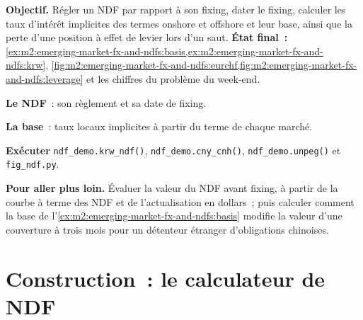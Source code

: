\begin{tutorial}
\textbf{Objectif.} Régler un NDF par rapport à son fixing, dater le fixing, calculer les
taux d'intérêt implicites des termes onshore et offshore et leur base, ainsi que la
perte d'une position à effet de levier lors d'un saut. \textbf{État final~:}
\cref{ex:m2:emerging-market-fx-and-ndfs:basis,ex:m2:emerging-market-fx-and-ndfs:krw},
\cref{fig:m2:emerging-market-fx-and-ndfs:eurchf,fig:m2:emerging-market-fx-and-ndfs:leverage}
et les chiffres du problème du week-end.
\begin{tutsteps}
\item \textbf{Le NDF}~: son règlement et sa date de fixing.
\label{lst:m2:emerging-market-fx-and-ndfs:ndf}
\item \textbf{La base}~: taux locaux implicites à partir du terme de chaque marché.
\label{lst:m2:emerging-market-fx-and-ndfs:basis}
\item \textbf{Exécuter} \texttt{ndf\_demo.krw\_ndf()}, \texttt{ndf\_demo.cny\_cnh()},
\texttt{ndf\_demo.unpeg()} et \texttt{fig\_ndf.py}.
\end{tutsteps}
\textbf{Pour aller plus loin.} Évaluer la valeur du NDF avant fixing, à partir de
la courbe à terme des NDF et de l'actualisation en dollars~; puis calculer comment la base de
l'\cref{ex:m2:emerging-market-fx-and-ndfs:basis} modifie la valeur d'une couverture à trois mois
pour un détenteur étranger d'obligations chinoises.
\end{tutorial}

\section{Construction~: le calculateur de NDF}\label{bld:m2:emerging-market-fx-and-ndfs:ndf}

